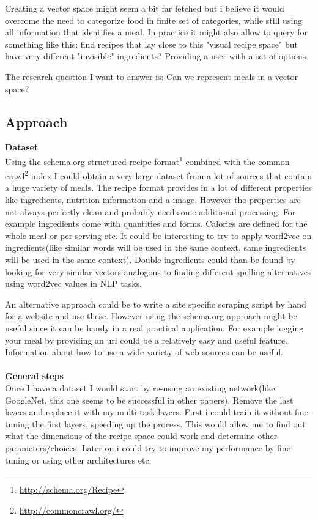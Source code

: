 \documentclass[a4paper]{scrartcl}
\begin{document}
Creating a vector space might seem a bit far fetched but i believe it would overcome the need to categorize food in finite set of categories, while still using all information that identifies a meal. In practice it might also allow to query for something like this: find recipes that lay close to this "visual recipe space" but have very different "invisible" ingredients? Providing a user with a set of options. 

The research question I want to answer is: Can we represent meals in a vector space?

\subsection{Approach}
\textbf{Dataset} \\ 
Using the schema.org structured recipe format\footnote{\url{http://schema.org/Recipe}} combined with the common crawl\footnote{\url{http://commoncrawl.org/}} index I could obtain a very large dataset from a lot of sources that contain a huge variety of meals. The recipe format provides in a lot of different properties like ingredients, nutrition information and a image.  However the properties are not always perfectly clean and probably need some additional processing. For example ingredients come with quantities and forms. Calories are defined for the whole meal or per serving etc. It could be interesting to try to apply word2vec on ingredients(like similar words will be used in the same context, same ingredients will be used in the same context). Double ingredients could than be found by looking for very similar vectors analogous to finding different spelling alternatives using word2vec values in NLP tasks.

An alternative approach could be to write a site specific scraping script by hand for a website and use these. However using the schema.org approach might be useful since it can be handy in a real practical application. For example logging your meal by providing an url could be a relatively easy and useful feature. Information about how to use a wide variety of web sources can be useful. 
\\ \\
\textbf{General steps}\\
Once I have a dataset I would start by re-using an existing network(like GoogleNet, this one seems to be successful in other papers). Remove the last layers and replace it with my multi-task layers. First i could train it without fine-tuning the first layers, speeding up the process. This would allow me to find out what the dimensions of the recipe space could work and determine other parameters/choices. Later on i could try to improve my performance by fine-tuning or using other architectures etc. 
\end{document}
